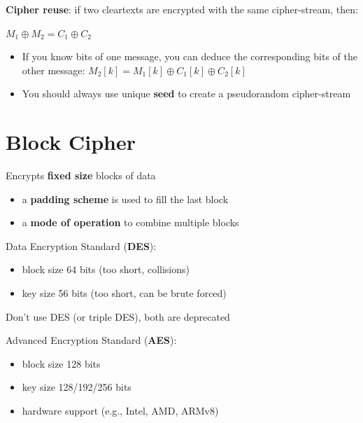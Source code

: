 \documentclass[11pt]{article}
\begin{document}
\textbf{Cipher reuse}: if two cleartexts are encrypted with the same cipher-stream, then: 

$M_1 \oplus M_2 = C_1 \oplus C_2$

\begin{itemize}
	\item If you know bits of one message, you can deduce the corresponding bits of the other message: $M_2[k] = M_1[k] \oplus C_1[k] \oplus C_2[k]$
	\item You should always use unique \textbf{seed} to create a pseudorandom cipher-stream
\end{itemize}

\section*{Block Cipher}

Encrypts \textbf{fixed size} blocks of data

\begin{itemize}
	\item a \textbf{padding scheme} is used to fill the last block
	\item a \textbf{mode of operation} to combine multiple blocks
\end{itemize}

Data Encryption Standard (\textbf{DES}):
\begin{itemize}
	\item block size 64 bits (too short, collisions)
	\item key size 56 bits (too short, can be brute forced)
\end{itemize}

\begin{tcolorbox}[
  colback=red!15,     %
  colframe=black!50,    %
  boxrule=1pt,       %
  arc=3mm,             %
  left=4mm, right=4mm, top=2mm, bottom=2mm %
]

Don't use DES (or triple DES), both are deprecated
\end{tcolorbox}

Advanced Encryption Standard (\textbf{AES}):
\begin{itemize}
	\item block size 128 bits
	\item key size 128/192/256 bits
	\item hardware support (e.g., Intel, AMD, ARMv8)
\end{itemize}
\end{document}
